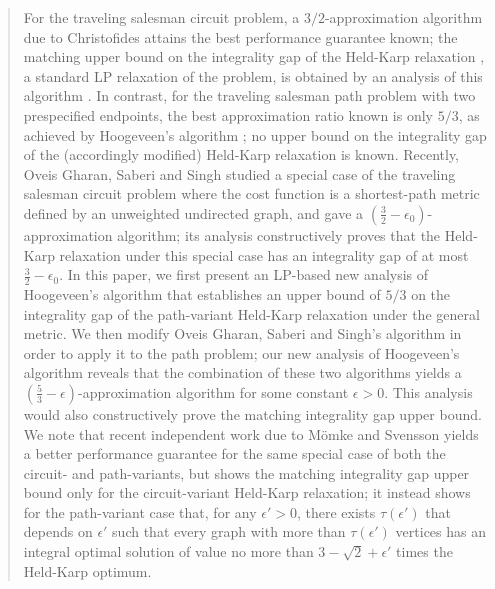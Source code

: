 \documentclass[11pt,letterpaper]{article}
\begin{document}
\begin{quote}
For the traveling salesman circuit problem, a $3/2$-approximation algorithm due to Christofides \cite{C} attains the best performance guarantee known; the matching upper bound on the integrality gap of the Held-Karp relaxation \cite{HK}, a standard LP relaxation of the problem, is obtained by an analysis of this algorithm \cite{W, SW}. In contrast, for the traveling salesman path problem with two prespecified endpoints, the best approximation ratio known is only $5/3$, as achieved by Hoogeveen's algorithm \cite{H}; no upper bound on the integrality gap of the (accordingly modified) Held-Karp relaxation is known. Recently, Oveis Gharan, Saberi and Singh \cite{OSS} studied a special case of the traveling salesman circuit problem where the cost function is a shortest-path metric defined by an unweighted undirected graph, and gave a $(\frac{3}{2}-\epsilon_0)$-approximation algorithm; its analysis constructively proves that the Held-Karp relaxation under this special case has an integrality gap of at most $\frac{3}{2}-\epsilon_0$. In this paper, we first present an LP-based new analysis of Hoogeveen's algorithm that establishes an upper bound of $5/3$ on the integrality gap of the path-variant Held-Karp relaxation under the general metric. We then modify Oveis Gharan, Saberi and Singh's algorithm in order to apply it to the path problem; our new analysis of Hoogeveen's algorithm reveals that the combination of these two algorithms yields a $(\frac{5}{3}-\epsilon)$-approximation algorithm for some constant $\epsilon >0$. This analysis would also constructively prove the matching integrality gap upper bound. We note that recent independent work due to M\"omke and Svensson \cite{MS} yields a better performance guarantee for the same special case of both the circuit- and path-variants, but shows the matching integrality gap upper bound only for the circuit-variant Held-Karp relaxation; it instead shows for the path-variant case that, for any $\epsilon'>0$, there exists $\tau(\epsilon')$ that depends on $\epsilon'$ such that every graph with more than $\tau(\epsilon')$ vertices has an integral optimal solution of value no more than $3-\sqrt{2}+\epsilon'$ times the Held-Karp optimum.


\end{quote}
\end{document}
